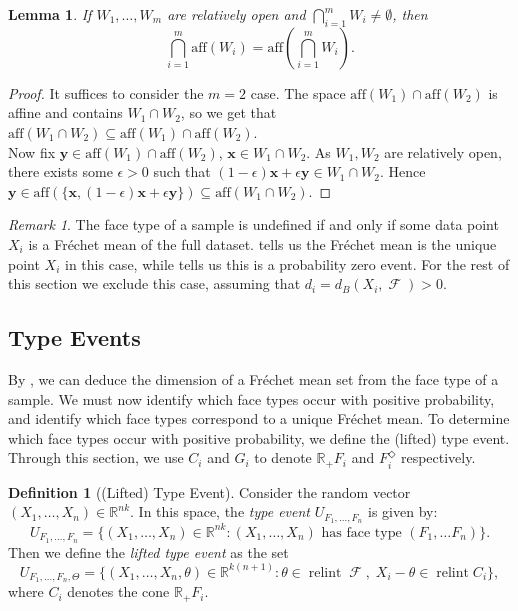 \documentclass[10pt]{article}
\newtheorem{lemma}[theorem]{Lemma}
\theoremstyle{definition}
\newtheorem{definition}[theorem]{Definition}
\theoremstyle{remark}
\newtheorem{remark}[theorem]{Remark}
\newcommand{\R}{\mathbb{R}}
\newcommand{\CType}{F_1,\dots,F_n}
\newcommand{\sample}{ X_1,\dots, X_n}
\DeclareMathOperator{\relint}{relint}
\DeclareMathOperator{\FMset}{\mathcal{F}}
\renewcommand{\vec}[1]{\mathbf{#1}}
\begin{document}
	\begin{lemma}\label{lemma:affine_intersection}
		If $W_1,\ldots,W_m$ are relatively open and $\textstyle \bigcap_{i=1}^m W_i \neq \emptyset$, then
		$$
		\textstyle\bigcap_{i=1}^m\mathrm{aff}(W_i) = \mathrm{aff} \left( \textstyle\bigcap_{i=1}^m W_i \right).
		$$
	\end{lemma}
	\begin{proof}
		It suffices to consider the $m=2$ case. The space $\text{aff}(W_1) \cap \text{aff}(W_2)$ is affine and contains $W_1 \cap W_2$, so we get that $\text{aff}(W_1 \cap W_2) \subseteq \text{aff}(W_1) \cap \text{aff}(W_2)$.\\
		Now fix $\vec y \in \text{aff}(W_1) \cap \text{aff}(W_2)$, $\vec x \in W_1 \cap W_2$. As $W_1,W_2$ are relatively open, there exists some $\epsilon > 0$ such that $(1-\epsilon)\vec x + \epsilon \vec y \in W_1 \cap W_2$. Hence $\vec y \in \text{aff}(\{ \vec x, (1-\epsilon)\vec x + \epsilon \vec y \}) \subseteq \text{aff}(W_1 \cap W_2)$.     
	\end{proof}
	
	\begin{remark}\label{rmk:positive_dist_to_data}
		The face type of a sample is undefined if and only if some data point $X_i$ is a Fr\'echet mean of the full dataset.  tells us the Fr\'echet mean is the unique point $X_i$ in this case, while  tells us this is a probability zero event. For the rest of this section we exclude this case, assuming that $d_i = d_B(X_i, \FMset) > 0$.
	\end{remark}
	
	\subsection{Type Events}
	
	By , we can deduce the dimension of a Fr\'echet mean set from the face type of a sample. We must now identify which face types occur with positive probability, and identify which face types correspond to a unique Fr\'echet mean. To determine which face types occur with positive probability, we define the (lifted) type event. Through this section, we use $C_i$ and $G_i$ to denote $\R_+ F_i$ and $F_i^{\Diamond}$ respectively.
	
	\begin{definition}[(Lifted) Type Event]
		Consider the random vector $(\sample) \in \R^{nk}$. In this space, the \emph{type event} $U_{\CType}$ is given by:
		\[
		U_{F_1, \dots, F_n} = \{ (\sample) \in \R^{nk}: (\sample) \text{ has face type }(F_1, \dots F_n) \}.
		\]
		Then we define the \emph{lifted type event} as the set
		\[
		U_{F_1, \dots, F_n, \Theta} = \{ (\sample, \theta) \in \R^{k(n+1)} : \theta \in \relint \FMset, 
		\; X_i - \theta \in \relint C_i \},
		\]
		where $C_i$ denotes the cone $\R_+ F_i$.
	\end{definition}
	
\end{document}

